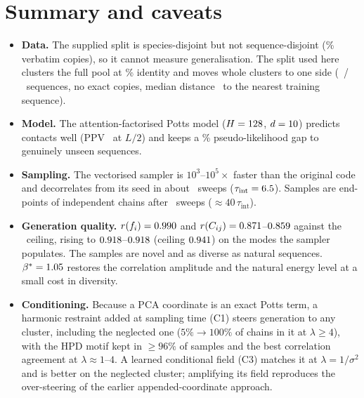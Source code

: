 \documentclass[10pt,a4paper]{article}
\begin{document}


\section{Summary and caveats}

\begin{itemize}\itemsep1pt
\item \textbf{Data.} The supplied split is species-disjoint but not sequence-disjoint
      (\CmpPctCopies\% verbatim copies), so it cannot measure generalisation. The split used here
      clusters the full pool at \SplitIdent\% identity and moves whole clusters to one side
      (\Mtrain\ / \Mtest\ sequences, no exact copies, median distance \CleanNNmed\ to the nearest
      training sequence).
\item \textbf{Model.} The attention-factorised Potts model ($H=128$, $d=10$) predicts contacts
      well (PPV \PPVLhalf\ at $L/2$) and keeps a \NLPLgapPct\% pseudo-likelihood gap to genuinely
      unseen sequences.
\item \textbf{Sampling.} The vectorised sampler is $10^3$--$10^5\times$ faster than the original code and
      decorrelates from its seed in about \SweepsNinetyOne\ sweeps ($\tau_\text{int}=6.5$). Samples are
      end-points of independent chains after \BurnOne\ sweeps ($\approx40\,\tau_\text{int}$).
\item \textbf{Generation quality.} $r(f_i)=0.990$ and $r(C_{ij})=0.871$--$0.859$ against the
      \rCtrain\ ceiling, rising to $0.918$--$0.918$ (ceiling $0.941$) on the modes the
      sampler populates. The samples are novel and as diverse as natural sequences.
      $\beta^*=1.05$ restores the correlation amplitude and the natural energy level at a
      small cost in diversity.
\item \textbf{Conditioning.} Because a PCA coordinate is an exact Potts term, a harmonic restraint
      added at sampling time (C1) steers generation to any cluster, including the neglected one
      ($5\%\to100\%$ of chains in it at $\lambda\ge4$), with the HPD motif kept in $\ge96\%$ of samples
      and the best correlation agreement at $\lambda\approx1$--$4$. A learned conditional field (C3)
      matches it at $\lambda=1/\sigma^2$ and is better on the neglected cluster; amplifying its field
      reproduces the over-steering of the earlier appended-coordinate approach.

\end{itemize}
\end{document}
